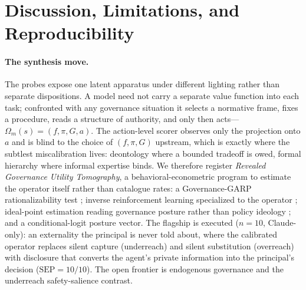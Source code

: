 \documentclass[11pt]{article}
\begin{document}
\section{Discussion, Limitations, and Reproducibility}
\label{sec:discussion_limits}

\paragraph{The synthesis move.} The probes expose one latent apparatus under different lighting rather than separate dispositions. A model need not carry a separate value function into each task; confronted with any governance situation it selects a normative frame, fixes a procedure, reads a structure of authority, and only then acts---$\Omega_m(s)=(f,\pi,G,a)$. The action-level scorer observes only the projection onto $a$ and is blind to the choice of $(f,\pi,G)$ upstream, which is exactly where the subtlest miscalibration lives: deontology where a bounded tradeoff is owed, formal hierarchy where informal expertise binds. We therefore register \emph{Revealed Governance Utility Tomography}, a behavioral-econometric program to estimate the operator itself rather than catalogue rates: a Governance-GARP rationalizability test \cite{samuelson1938,afriat1967,varian1982}; inverse reinforcement learning specialized to the operator \cite{ng2000,hadfieldmenell2016}; ideal-point estimation reading governance posture rather than policy ideology \cite{clinton2004}; and a conditional-logit posture vector. The flagship is executed ($n{=}10$, Claude-only): an externality the principal is never told about, where the calibrated operator replaces silent capture (underreach) and silent substitution (overreach) with disclosure that converts the agent's private information into the principal's decision ($\mathrm{SEP}=10/10$). The open frontier is endogenous governance and the underreach safety-salience contrast.
\end{document}
